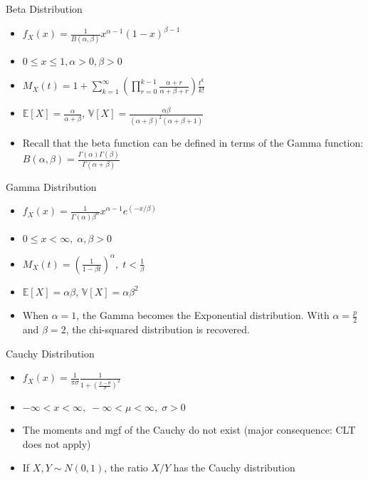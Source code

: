 \documentclass[avery5371,grid]{flashcards}
\begin{document}
\begin{flashcard}[Definition]{Beta Distribution}
\begin{itemize}
\item $f_X(x) = \frac{1}{B(\alpha, \beta)} x^{\alpha -1} (1-x)^{\beta -1}$
\item $0 \le x \le 1, \alpha > 0, \beta > 0$
\item $M_{X}\left(t\right)= 1 + \sum_{k=1}^\infty  \left( \prod_{r=0}^{k-1} \frac{\alpha + r}{\alpha + \beta + r} \right) \frac{t^k}{k!}$
\item $\mathbb{E}\left[X\right]=\frac{\alpha}{\alpha + \beta}$, $\mathbb{V}\left[X\right]= \frac{\alpha \beta}{(\alpha + \beta)^2 (\alpha + \beta + 1)}$
\item Recall that the beta function can be defined in terms of the Gamma function: $B(\alpha,\beta) = \frac{\Gamma(\alpha)\Gamma(\beta)}{\Gamma(\alpha + \beta)}$
\end{itemize}
\end{flashcard}

\begin{flashcard}[Definition]{Gamma Distribution}
\begin{itemize}
\item $f_X(x) = \frac{1}{\Gamma(\alpha) \beta^\alpha} x^{\alpha -1} e^{(-x/\beta)}$
\item $0 \le x < \infty, \; \alpha,\beta > 0$
\item $M_{X}\left(t\right)= \left( \frac{1}{1-\beta t} \right)^\alpha, \; t<\frac{1}{\beta}$
\item $\mathbb{E}\left[X\right]=\alpha \beta$, $\mathbb{V}\left[X\right]= \alpha \beta^2$
\item When $\alpha = 1$, the Gamma becomes the Exponential distribution. With  $\alpha = \frac{p}{2}$ and $\beta = 2$, the chi-squared distribution is recovered.
\end{itemize}
\end{flashcard}

\begin{flashcard}[Definition]{Cauchy Distribution}
\begin{itemize}
\item $f_X(x) = \frac{1}{\pi \sigma} \frac{1}{1+\left( \frac{x-\theta}{\sigma} \right)^2}$
\item $- \infty < x < \infty, \; - \infty < \mu < \infty, \; \sigma > 0$
\item The moments and mgf of the Cauchy do not exist (major consequence: CLT does not  apply)
\item If $X, Y \sim N(0,1)$, the ratio $X / Y$ has the Cauchy distribution
\end{itemize}
\end{flashcard}
\end{document}
